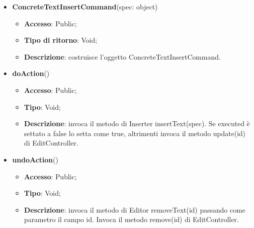 {{{	
	\begin{itemize}
		\item \textbf{ConcreteTextInsertCommand}(spec: object)
		\begin{itemize}
			\item \textbf{Accesso}: Public;
			\item \textbf{Tipo di ritorno}: Void;
			\item \textbf{Descrizione}: costruisce l’oggetto ConcreteTextInsertCommand.
		\end{itemize}
		\item \textbf{doAction}()
		\begin{itemize}
			\item \textbf{Accesso}: Public;
			\item \textbf{Tipo}: Void;
			\item \textbf{Descrizione}: invoca il metodo di Inserter insertText(spec). Se executed è settato a false lo setta come true, altrimenti invoca il metodo update(id) di EditController.
		\end{itemize}
		\item \textbf{undoAction}()
		\begin{itemize}
			\item \textbf{Accesso}: Public;
			\item \textbf{Tipo}: Void;
			\item \textbf{Descrizione}: invoca il metodo di Editor removeText(id) passando come parametro il campo id. Invoca il metodo remove(id) di EditController.
		\end{itemize}
	\end{itemize}
	}
	
}}
